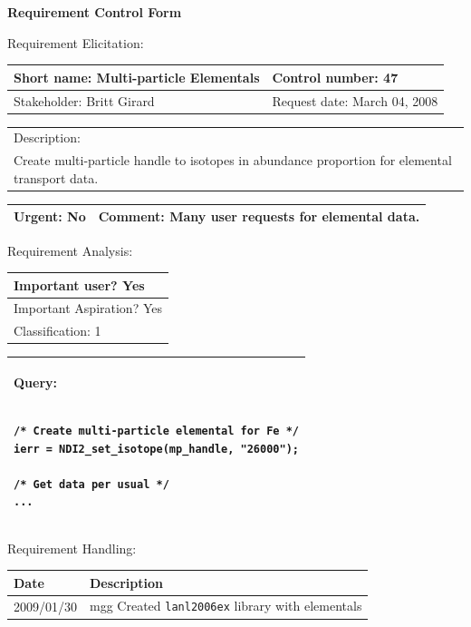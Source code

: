 \begin{center}\Large\bf
Requirement Control Form
\end{center}
\vspace{24pt}

Requirement Elicitation:

\begin{tabular}{|p{211pt}|p{211pt}|} \hline
Short name: Multi-particle Elementals & Control number: 47\\ \hline
Stakeholder: Britt Girard & Request date: March 04, 2008\\
\end{tabular}
\begin{tabular}{|p{433pt}|} \hline
Description: \\ 
Create multi-particle handle to isotopes in abundance proportion for
elemental transport data.\\ 
\hline
\end{tabular} 
\begin{tabular}{|p{211pt}|p{211pt}|} \hline
Urgent: No & Comment: Many user requests for elemental data.\\ \hline
\end{tabular}

\vspace{24pt}

Requirement Analysis:

\begin{tabular}{|p{433pt}|} \hline
Important user? Yes \\ \hline
Important Aspiration? Yes \\ \hline
Classification: 1 \\ \hline
\end{tabular}

\vspace{12pt}

\begin{tabular}{|p{433pt}|} \hline
Query:
\begin{verbatim}

/* Create multi-particle elemental for Fe */
ierr = NDI2_set_isotope(mp_handle, "26000");

/* Get data per usual */
...

\end{verbatim}
\\ \hline

\end{tabular}

\vspace{24pt}

Requirement Handling:

\begin{tabular}{|p{72pt}|p{351pt}|} \hline
Date & Description \\ \hline
2009/01/30 & mgg Created \texttt{lanl2006ex} library with elementals
\\ \hline
\end{tabular}

